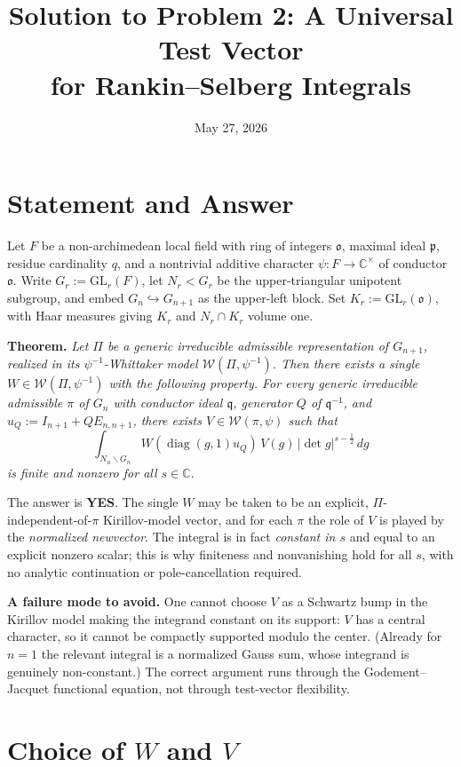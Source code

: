 \documentclass[11pt]{article}
\title{Solution to Problem 2: A Universal Test Vector\\
for Rankin--Selberg Integrals}
\author{}
\date{May 27, 2026}
\newcommand{\F}{F}
\newcommand{\oo}{\mathfrak{o}}
\newcommand{\pp}{\mathfrak{p}}
\newcommand{\qq}{\mathfrak{q}}
\newcommand{\C}{\mathbb{C}}
\newcommand{\GL}{\mathrm{GL}}
\newcommand{\W}{\mathcal{W}}
\newcommand{\diag}{\operatorname{diag}}
\begin{document}
\maketitle

\section*{Statement and Answer}

Let $\F$ be a non-archimedean local field with ring of integers $\oo$, maximal
ideal $\pp$, residue cardinality $q$, and a nontrivial additive character
$\psi:\F\to\C^\times$ of conductor $\oo$. Write $G_r:=\GL_r(\F)$, let $N_r<G_r$
be the upper-triangular unipotent subgroup, and embed $G_n\hookrightarrow
G_{n+1}$ as the upper-left block. Set $K_r:=\GL_r(\oo)$, with Haar measures
giving $K_r$ and $N_r\cap K_r$ volume one.

\medskip
\noindent\textbf{Theorem.} \emph{Let $\Pi$ be a generic irreducible admissible
representation of $G_{n+1}$, realized in its $\psi^{-1}$-Whittaker model
$\W(\Pi,\psi^{-1})$. Then there exists a single $W\in\W(\Pi,\psi^{-1})$ with the
following property. For every generic irreducible admissible $\pi$ of $G_n$ with
conductor ideal $\qq$, generator $Q$ of $\qq^{-1}$, and
$u_Q:=I_{n+1}+QE_{n,n+1}$, there exists $V\in\W(\pi,\psi)$ such that}
\[
\int_{N_n\backslash G_n} W(\diag(g,1)u_Q)\,V(g)\,|\det g|^{s-\frac12}\,dg
\]
\emph{is finite and nonzero for all $s\in\C$.}

\medskip
\noindent The answer is \textbf{YES}. The single $W$ may be taken to be an
explicit, $\Pi$-independent-of-$\pi$ Kirillov-model vector, and for each $\pi$
the role of $V$ is played by the \emph{normalized newvector}. The integral is in
fact \emph{constant in $s$} and equal to an explicit nonzero scalar; this is why
finiteness and nonvanishing hold for all $s$, with no analytic continuation or
pole-cancellation required.

\medskip
\noindent\textbf{A failure mode to avoid.} One cannot choose $V$ as a
Schwartz bump in the Kirillov model making the integrand constant on its
support: $V$ has a central character, so it cannot be compactly supported modulo
the center. (Already for $n=1$ the relevant integral is a normalized Gauss sum,
whose integrand is genuinely non-constant.) The correct argument runs through the
Godement--Jacquet functional equation, not through test-vector flexibility.

\section*{Choice of $W$ and $V$}
\end{document}
